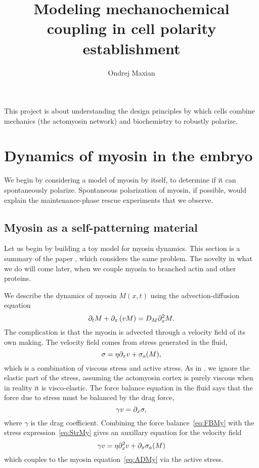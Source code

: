 \documentclass[11pt]{article}
\title{Modeling mechanochemical coupling in cell polarity establishment  \vspace{-0.5 cm}}
\author{Ondrej Maxian  \vspace{-0.75 cm}}
\newcommand{\6}[1]{#1_{\text{6}}}
\newcommand{\3}[1]{#1_{\text{3}}}
\begin{document}
\maketitle
This project is about understanding the design principles by which cells combine mechanics (the actomyosin network) and biochemistry to robustly polarize. 


\section{Dynamics of myosin in the embryo \label{sec:myosin}}
We begin by considering a model of myosin by itself, to determine if it can spontaneously polarize. Spontaneous polarization of myosin, if possible, would explain the maintenance-phase rescue experiments that we observe.

\subsection{Myosin as a self-patterning material} 
Let us begin by building a toy model for myosin dynamics. This section is a summary of the paper \cite{bois2011pattern}, which considers the same problem. The novelty in what we do will come later, when we couple myosin to branched actin and other proteins. 

We describe the dynamics of myosin $M(x,t)$ using the advection-diffusion equation
\begin{equation}
\label{eq:ADMy}
\partial_t M + \partial_x \left(v M\right) = D_M \partial_x^2 M.
\end{equation}
The complication is that the myosin is advected through a velocity field of its own making. The velocity field comes from stress generated in the fluid, 
\begin{equation}
\label{eq:StrMy}
\sigma = \eta \partial_x{v} + \sigma_a(M),
\end{equation}
which is a combination of viscous stress and active stress. As in \cite{bois2011pattern}, we ignore the elastic part of the stress, assuming the actomyosin cortex is purely viscous when in reality it is visco-elastic. The force balance equation in the fluid says that the force due to stress must be balanced by the drag force, 
\begin{equation}
\label{eq:FBMy}
\gamma v = \partial_x \sigma,
\end{equation}
where $\gamma$ is the drag coefficient. Combining the force balance\ \eqref{eq:FBMy} with the stress expression\ \eqref{eq:StrMy} gives an auxillary equation for the velocity field
\begin{equation}
\gamma v = \eta \partial_x^2 v + \partial_x \sigma_a(M)
\end{equation}
which couples to the myosin equation\ \eqref{eq:ADMy} via the active stress.
\end{document}

